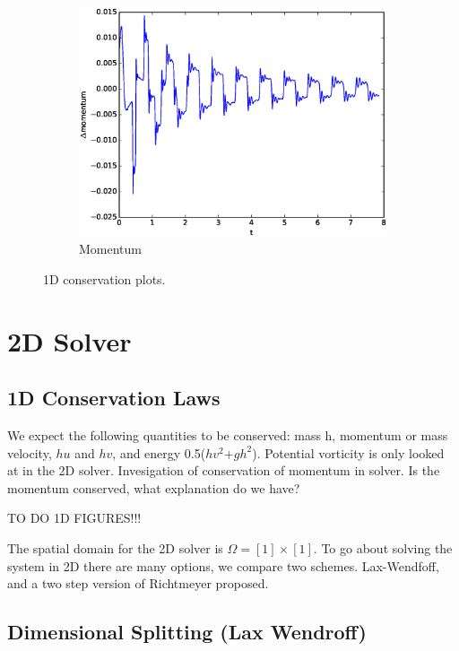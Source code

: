 \begin{figure}[htp]
\begin{subfigure}[b]{0.32\textwidth}
        \centering
        \includegraphics[width=\textwidth]{images/Mo1d.eps}\hfill
        \caption{Momentum}
        \label{Momentum}
    \end{subfigure}
    \caption{1D conservation plots.}
    \label{fig:three graphs}
\end{figure}

\section{2D Solver}
\subsection{1D Conservation Laws}
We expect the following quantities to be conserved: mass h, momentum or mass velocity, $hu$ and $hv$, and
energy 0.5($hv^2$+$gh^2$). Potential vorticity is only looked at in the 2D solver. Invesigation of conservation of momentum in solver.
 Is the momentum conserved, what explanation do we have?

TO DO 1D FIGURES!!!



The spatial domain for the 2D solver is \(\Omega =[{  }1]\times [{  }1].\) To go about solving the system in 2D there are many options,
we compare two schemes. Lax-Wendfoff, and a two step version of Richtmeyer proposed. \newline
\newline

\subsection{Dimensional Splitting (Lax Wendroff)}

